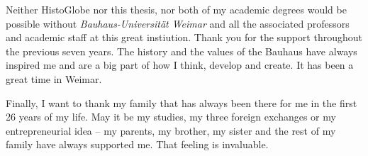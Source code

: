 Neither HistoGlobe nor this thesis, nor both of my academic degrees would be possible without \emph{Bauhaus-Universität Weimar} and all the associated professors and academic staff at this great instiution. Thank you for the support throughout the previous seven years. The history and the values of the Bauhaus have always inspired me and are a big part of how I think, develop and create. It has been a great time in Weimar.

Finally, I want to thank my family that has always been there for me in the first 26 years of my life. May it be my studies, my three foreign exchanges or my entrepreneurial idea -- my parents, my brother, my sister and the rest of my family have always supported me. That feeling is invaluable.

